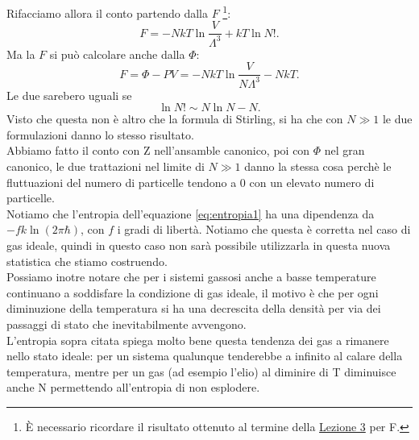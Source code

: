 Rifacciamo allora il conto partendo dalla $F$ \footnote{È necessario ricordare il risultato ottenuto al termine della \hyperref[eq:F_Z]{Lezione 3} per F.}:
\[
	F = -NkT \ln \frac{V}{\Lambda ^3} + kT \ln N!
.\] 
Ma la $F$ si può calcolare anche dalla $\Phi $:
\[
	F = \Phi  - PV = -NkT \ln \frac{V}{N\Lambda ^3} - NkT
.\] 
Le due sarebero uguali se 
\[
	\ln N! \sim N \ln N-N
.\]
Visto che questa non è altro che la formula di Stirling, si ha che con $N\gg 1$ le due formulazioni danno lo stesso risultato.\\
Abbiamo fatto il conto con Z nell'ansamble canonico, poi con $\Phi $ nel gran canonico, le due trattazioni nel limite di $N\gg 1$ danno la stessa cosa perchè le fluttuazioni del numero di particelle tendono a 0 con un elevato numero di particelle.\\
Notiamo che l'entropia dell'equazione \eqref{eq:entropia1} ha una dipendenza da $-f k \ln \left( 2\pi\hbar  \right)$, con $f$ i gradi di libertà. Notiamo che questa è corretta nel caso di gas ideale, quindi in questo caso non sarà possibile utilizzarla in questa nuova statistica che stiamo costruendo.\\
Possiamo inotre notare che per i sistemi gassosi anche a basse temperature continuano a soddisfare la condizione di gas ideale, il motivo è che per ogni diminuzione della temperatura si ha una decrescita della densità per via dei passaggi di stato che inevitabilmente avvengono.\\
L'entropia sopra citata spiega molto bene questa tendenza dei gas a rimanere nello stato ideale: per un sistema qualunque tenderebbe a infinito al calare della temperatura, mentre per un gas (ad esempio l'elio) al diminire di T diminuisce anche N permettendo all'entropia di non esplodere.

